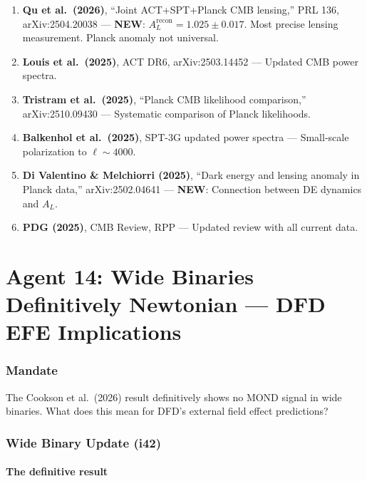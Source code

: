 \documentclass[11pt,a4paper]{article}
\newcommand{\NEW}{\textcolor{dfdblue}{\textbf{NEW}}}
\begin{document}
\begin{enumerate}
\item \textbf{Qu et al.\ (2026)}, ``Joint ACT+SPT+Planck CMB lensing,'' PRL 136, arXiv:2504.20038 --- \NEW: $A_L^{\mathrm{recon}} = 1.025 \pm 0.017$. Most precise lensing measurement. Planck anomaly not universal.

\item \textbf{Louis et al.\ (2025)}, ACT DR6, arXiv:2503.14452 --- Updated CMB power spectra.

\item \textbf{Tristram et al.\ (2025)}, ``Planck CMB likelihood comparison,'' arXiv:2510.09430 --- Systematic comparison of Planck likelihoods.

\item \textbf{Balkenhol et al.\ (2025)}, SPT-3G updated power spectra --- Small-scale polarization to $\ell \sim 4000$.

\item \textbf{Di Valentino \& Melchiorri (2025)}, ``Dark energy and lensing anomaly in Planck data,'' arXiv:2502.04641 --- \NEW: Connection between DE dynamics and $A_L$.

\item \textbf{PDG (2025)}, CMB Review, RPP --- Updated review with all current data.
\end{enumerate}


\part{Agent 14: Wide Binaries Definitively Newtonian --- DFD EFE Implications}
\label{part:agent14}

\section{Mandate}

The Cookson et al.\ (2026) result definitively shows no MOND signal in wide binaries. What does this mean for DFD's external field effect predictions?

\section{Wide Binary Update (i42)}

\subsection{The definitive result}
\end{document}
